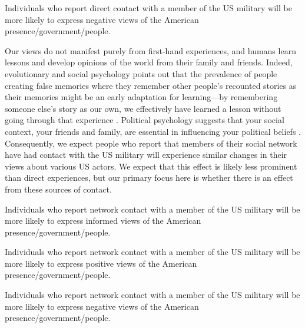 \begin{subhyp}
	\begin{hyp}
		Individuals who report direct contact with a member of the US military will be more likely to express negative views of the American presence/government/people. 
	\end{hyp}
	
	Our views do not manifest purely from first-hand experiences, and humans learn lessons and develop opinions of the world from their family and friends. Indeed, evolutionary and social psychology points out that the prevalence of people creating false memories where they remember other people's recounted stories as their memories might be an early adaptation for learning---by remembering someone else's story as our own, we effectively have learned a lesson without going through that experience \cite{Ginsburg2010,Howe2011}. Political psychology suggests that your social context, your friends and family, are essential in influencing your political beliefs \cite{Campbell1960,Jasper1995,Settle2010}. Consequently, we expect people who report that members of their social network have had contact with the US military will experience similar changes in their views about various US actors. We expect that this effect is likely less prominent than direct experiences, but our primary focus here is whether there is an effect from these sources of contact. 
	
\end{subhyp}


\begin{subhyp}
	
	\begin{hyp}
		Individuals who report network contact with a member of the US military will be more likely to express informed views of the American presence/government/people. 
	\end{hyp}
	
	
	\begin{hyp}
		Individuals who report network contact with a member of the US military will be more likely to express positive views of the American presence/government/people. 
	\end{hyp}
	
	\begin{hyp}
		Individuals who report network contact with a member of the US military will be more likely to express negative views of the American presence/government/people. 
	\end{hyp}
	
\end{subhyp}

